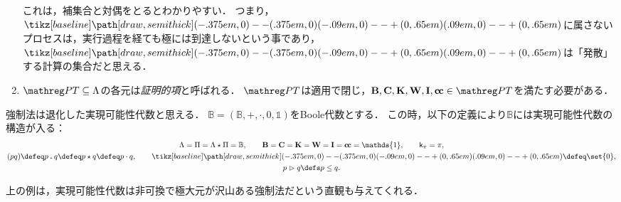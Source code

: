 \documentclass[realisability.tex]{subfiles}
\begin{document}
\begin{definition}
\begin{enumerate}
        これは，補集合と対偶をとるとわかりやすい．
        つまり，$\pole$に属さないプロセスは，実行過程を経ても極には到達しないという事であり，$\pole$は「発散」する計算の集合だと思える．
  \item $\PT \subseteq \Lambda$の各元は\emph{証明的項}と呼ばれる．
        $\PT$は適用で閉じ，$\B, \C, \K, \W, \I, \cc \in \PT$を満たす必要がある．
 \end{enumerate}
\end{definition}

\begin{example}[実現可能性代数としての強制法]
 強制法は退化した実現可能性代数と思える．
 $\mathbb{B} = (\mathbb{B}, {+}, {\cdot}, 0, \mathds{1})$をBoole代数とする\footnotemark．
 この時，以下の定義により$\mathbb{B}$には実現可能性代数の構造が入る：
 \begin{gather*}
  \Lambda = \Pi = \Lambda \cons \Pi = \mathbb{B}, \qquad
  \B = \C = \K = \W = \I = \cc = \mathds{1},\qquad \conti_\pi = \pi,\\
  (p q) \defeq p \push q \defeq p \cons q \defeq p \cdot q, \qquad
  \pole \defeq \set{0},\\
  p \reds q \defs p \leq q.
 \end{gather*}
\end{example}
上の例は，実現可能性代数は非可換で極大元が沢山ある強制法だという直観も与えてくれる．
\end{document}
